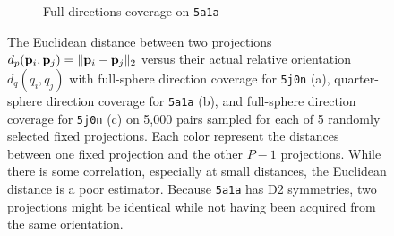 \begin{figure}[ht!]
\begin{minipage}[t]{0.99\linewidth}
\begin{subfigure}[t]{0.33\textwidth}
            \caption{Full directions coverage on \texttt{5a1a}}
            \label{fig:euclidean-not-robust:5a1a-full}
        \end{subfigure}
        \caption{%
            The Euclidean distance between two projections $d_p(\mathbf{p}_i, \mathbf{p}_j) = \Vert \mathbf{p}_i - \mathbf{p}_j \Vert_2$ versus their actual relative orientation $d_q(q_i, q_j)$ with full-sphere direction coverage for \texttt{5j0n} (a), quarter-sphere direction coverage for \texttt{5a1a} (b), and full-sphere direction coverage for \texttt{5j0n} (c) on 5,000 pairs sampled for each of 5 randomly selected fixed projections.
            Each color represent the distances between one fixed projection and the other $P-1$ projections.
            While there is some correlation, especially at small distances, the Euclidean distance is a poor estimator.
            Because \texttt{5a1a} has D2 symmetries, two projections might be identical while not having been acquired from the same orientation.
        }\label{fig:euclidean-not-robust}
    \end{minipage}
\end{figure}



